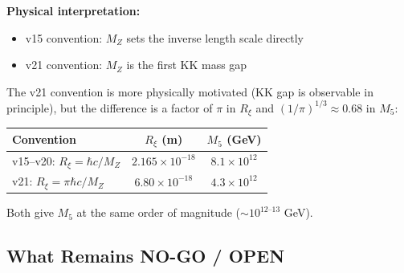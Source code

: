 \documentclass[11pt,a4paper]{article}
\newcommand{\Rxi}{R_\xi}
\newcommand{\Mfive}{M_5}
\newcommand{\MZ}{M_Z}
\begin{document}
\textbf{Physical interpretation:}
\begin{itemize}
\item v15 convention: $\MZ$ sets the inverse length scale directly
\item v21 convention: $\MZ$ is the first KK mass gap
\end{itemize}

The v21 convention is more physically motivated (KK gap is observable in principle),
but the difference is a factor of $\pi$ in $\Rxi$ and $(1/\pi)^{1/3} \approx 0.68$
in $\Mfive$:

\begin{center}
\begin{tabular}{lcc}
\toprule
\textbf{Convention} & \textbf{$\Rxi$ (m)} & \textbf{$\Mfive$ (GeV)} \\
\midrule
v15--v20: $\Rxi = \hbar c/\MZ$ & $2.165 \times 10^{-18}$ & $8.1 \times 10^{12}$ \\
v21: $\Rxi = \pi\hbar c/\MZ$ & $6.80 \times 10^{-18}$ & $4.3 \times 10^{12}$ \\
\bottomrule
\end{tabular}
\end{center}

Both give $\Mfive$ at the same order of magnitude ($\sim 10^{12\text{--}13}$ GeV).

\subsection{What Remains NO-GO / OPEN}
\end{document}
